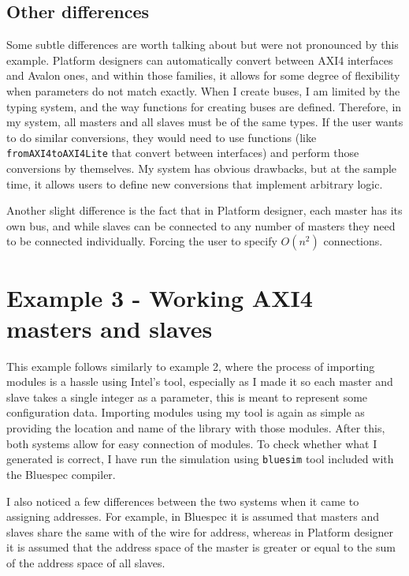 \documentclass[12pt]{report}
\begin{document}
\subsection{Other differences} 
Some subtle differences are worth talking about but were not pronounced by this example. 
Platform designers can automatically convert between AXI4 interfaces and Avalon ones, and within those families, it allows for some degree of flexibility when parameters do not match exactly. 
When I create buses, I am limited by the typing system, and the way functions for creating buses are defined. Therefore, in my system, all masters and all slaves must be of the same types. If the user wants to do similar conversions, they would need to use functions (like \verb!fromAXI4toAXI4Lite! that convert between interfaces) and perform those conversions by themselves. My system has obvious drawbacks, but at the sample time, it allows users to define new conversions that implement arbitrary logic. 
\par 
Another slight difference is the fact that in Platform designer, each master has its own bus, and while slaves can be connected to any number of masters they need to be connected individually. Forcing the user to specify $O(n^2)$ connections. 
\section{Example 3 - Working AXI4 masters and slaves} 
This example follows similarly to example 2, where the process of importing modules is a hassle using Intel's tool, especially as I made it so each master and slave takes a single integer as a parameter, this is meant to represent some configuration data. Importing modules using my tool is again as simple as providing the location and name of the library with those modules. After this, both systems allow for easy connection of modules. To check whether what I generated is correct, I have run the simulation using \verb!bluesim! tool included with the Bluespec compiler. 
\par
I also noticed a few differences between the two systems when it came to assigning addresses. For example, in Bluespec it is assumed that masters and slaves share the same with of the wire for address, whereas in Platform designer it is assumed that the address space of the master is greater or equal to the sum of the address space of all slaves.
 
\end{document}
